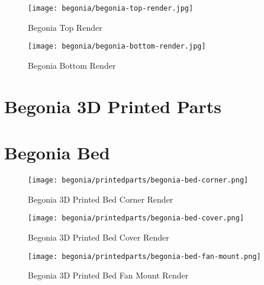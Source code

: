 \begin{figure}[H]
\centering
\texttt{[image: begonia/begonia-top-render.jpg]}
\caption{Begonia Top Render}
\label{fig:begtoprender}
\end{figure}

\begin{figure}[H]
\centering
\texttt{[image: begonia/begonia-bottom-render.jpg]}
\caption{Begonia Bottom Render}
\label{fig:begbottomrender}
\end{figure}


\section{Begonia 3D Printed Parts}

% 

\section{Begonia Bed}

\begin{figure}[H]
\centering
\texttt{[image: begonia/printedparts/begonia-bed-corner.png]}
\caption{Begonia 3D Printed Bed Corner Render}
\label{fig:begbedcornerrender}
\end{figure}

\begin{figure}[H]
\centering
\texttt{[image: begonia/printedparts/begonia-bed-cover.png]}
\caption{Begonia 3D Printed Bed Cover Render}
\label{fig:begbedcoverrender}
\end{figure}

\begin{figure}[H]
\centering
\texttt{[image: begonia/printedparts/begonia-bed-fan-mount.png]}
\caption{Begonia 3D Printed Bed Fan Mount Render}
\label{fig:begbedfanmountrender}
\end{figure}

